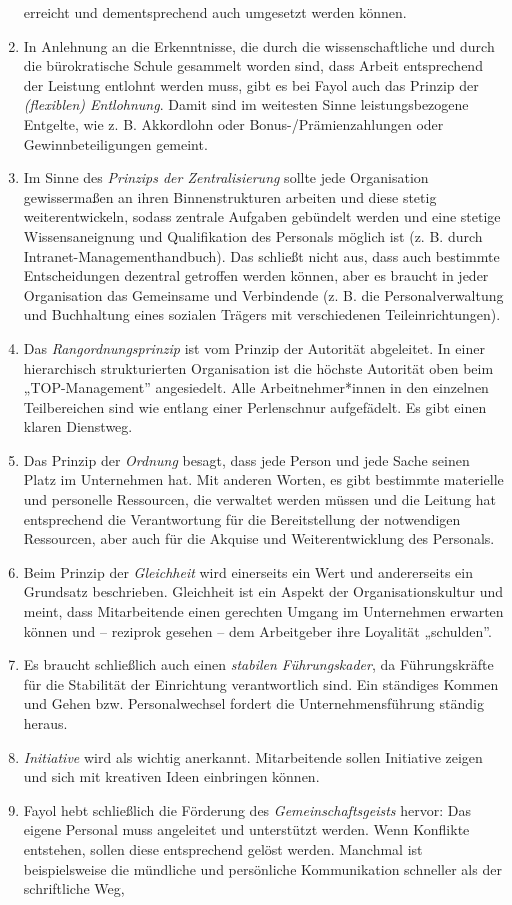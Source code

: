 \documentclass[
  letterpaper,
]{book}
\begin{document}
\begin{enumerate}
  erreicht und dementsprechend auch umgesetzt werden können.
\item
  In Anlehnung an die Erkenntnisse, die durch die wissenschaftliche und
  durch die bürokratische Schule gesammelt worden sind, dass Arbeit
  entsprechend der Leistung entlohnt werden muss, gibt es bei Fayol auch
  das Prinzip der \emph{(flexiblen) Entlohnung}. Damit sind im weitesten
  Sinne leistungsbezogene Entgelte, wie z. B. Akkordlohn oder
  Bonus-/Prämienzahlungen oder Gewinnbeteiligungen gemeint.
\item
  Im Sinne des \emph{Prinzips der Zentralisierung} sollte jede
  Organisation gewissermaßen an ihren Binnenstrukturen arbeiten und
  diese stetig weiterentwickeln, sodass zentrale Aufgaben gebündelt
  werden und eine stetige Wissensaneignung und Qualifikation des
  Personals möglich ist (z. B. durch Intranet-Managementhandbuch). Das
  schließt nicht aus, dass auch bestimmte Entscheidungen dezentral
  getroffen werden können, aber es braucht in jeder Organisation das
  Gemeinsame und Verbindende (z. B. die Personalverwaltung und
  Buchhaltung eines sozialen Trägers mit verschiedenen
  Teileinrichtungen).
\item
  Das \emph{Rangordnungsprinzip} ist vom Prinzip der Autorität
  abgeleitet. In einer hierarchisch strukturierten Organisation ist die
  höchste Autorität oben beim „TOP-Management'' angesiedelt. Alle
  Arbeitnehmer*innen in den einzelnen Teilbereichen sind wie entlang
  einer Perlenschnur aufgefädelt. Es gibt einen klaren Dienstweg.
\item
  Das Prinzip der \emph{Ordnung} besagt, dass jede Person und jede Sache
  seinen Platz im Unternehmen hat. Mit anderen Worten, es gibt bestimmte
  materielle und personelle Ressourcen, die verwaltet werden müssen und
  die Leitung hat entsprechend die Verantwortung für die Bereitstellung
  der notwendigen Ressourcen, aber auch für die Akquise und
  Weiterentwicklung des Personals.
\item
  Beim Prinzip der \emph{Gleichheit} wird einerseits ein Wert und
  andererseits ein Grundsatz beschrieben. Gleichheit ist ein Aspekt der
  Organisationskultur und meint, dass Mitarbeitende einen gerechten
  Umgang im Unternehmen erwarten können und -- reziprok gesehen -- dem
  Arbeitgeber ihre Loyalität „schulden''.
\item
  Es braucht schließlich auch einen \emph{stabilen Führungskader}, da
  Führungskräfte für die Stabilität der Einrichtung verantwortlich sind.
  Ein ständiges Kommen und Gehen bzw. Personalwechsel fordert die
  Unternehmensführung ständig heraus.
\item
  \emph{Initiative} wird als wichtig anerkannt. Mitarbeitende sollen
  Initiative zeigen und sich mit kreativen Ideen einbringen können.
\item
  Fayol hebt schließlich die Förderung des \emph{Gemeinschaftsgeists}
  hervor: Das eigene Personal muss angeleitet und unterstützt werden.
  Wenn Konflikte entstehen, sollen diese entsprechend gelöst werden.
  Manchmal ist beispielsweise die mündliche und persönliche
  Kommunikation schneller als der schriftliche Weg,
\end{enumerate}
\end{document}
